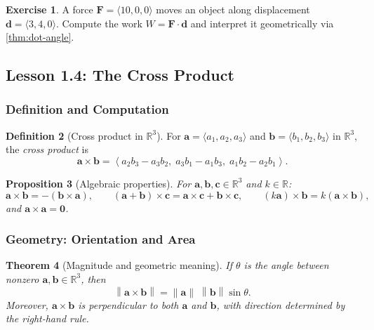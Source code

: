 \documentclass[12pt]{article}
\numberwithin{equation}{section}
\newcommand{\RR}{\mathbb{R}}
\newcommand{\vect}[1]{\boldsymbol{#1}}   %
\newcommand{\norm}[1]{\left\lVert #1\right\rVert}
\theoremstyle{plain}
\newtheorem{theorem}{Theorem}[section]
\newtheorem{proposition}[theorem]{Proposition}
\theoremstyle{definition}
\newtheorem{definition}[theorem]{Definition}
\newtheorem{exercise}[theorem]{Exercise}
\theoremstyle{remark}
\begin{document}
\begin{exercise}
A force $\vect{F}=\langle 10,0,0\rangle$ moves an object along displacement $\vect{d}=\langle 3,4,0\rangle$.  
Compute the work $W=\vect{F}\cdot\vect{d}$ and interpret it geometrically via \cref{thm:dot-angle}.
\end{exercise}


\subsection{Lesson 1.4: The Cross Product}

\subsubsection{Definition and Computation}

\begin{definition}[Cross product in $\RR^3$]
For $\vect{a}=\langle a_1,a_2,a_3\rangle$ and $\vect{b}=\langle b_1,b_2,b_3\rangle$ in $\RR^3$, the \emph{cross product} is
\begin{equation}\label{eq:cross}
\vect{a}\times\vect{b}
=
\left\langle
a_2b_3-a_3b_2,\;
a_3b_1-a_1b_3,\;
a_1b_2-a_2b_1
\right\rangle.
\end{equation}
\end{definition}

\begin{proposition}[Algebraic properties]
For $\vect{a},\vect{b},\vect{c}\in\RR^3$ and $k\in\RR$:
\[
\vect{a}\times\vect{b}=-(\vect{b}\times\vect{a}),\qquad
(\vect{a}+\vect{b})\times\vect{c}=\vect{a}\times\vect{c}+\vect{b}\times\vect{c},\qquad
(k\vect{a})\times\vect{b}=k(\vect{a}\times\vect{b}),
\]
and $\vect{a}\times\vect{a}=\vect{0}$.
\end{proposition}

\subsubsection{Geometry: Orientation and Area}

\begin{theorem}[Magnitude and geometric meaning]\label{thm:cross-geom}
If $\theta$ is the angle between nonzero $\vect{a},\vect{b}\in\RR^3$, then
\begin{equation}\label{eq:cross-mag}
\norm{\vect{a}\times\vect{b}}=\norm{\vect{a}}\;\norm{\vect{b}}\sin\theta.
\end{equation}
Moreover, $\vect{a}\times\vect{b}$ is perpendicular to both $\vect{a}$ and $\vect{b}$, with direction determined by the right-hand rule.
\end{theorem}
\end{document}
